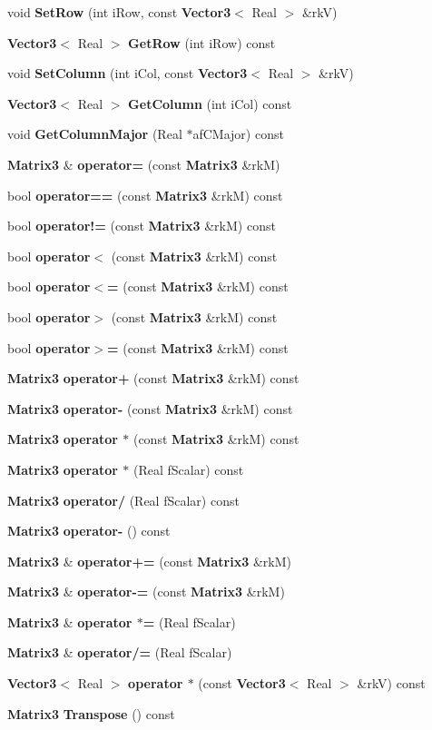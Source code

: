 \begin{CompactItemize}
void {\bf Set\-Row} (int i\-Row, const {\bf Vector3}$<$ Real $>$ \&rk\-V)
\item 
{\bf Vector3}$<$ Real $>$ {\bf Get\-Row} (int i\-Row) const
\item 
void {\bf Set\-Column} (int i\-Col, const {\bf Vector3}$<$ Real $>$ \&rk\-V)
\item 
{\bf Vector3}$<$ Real $>$ {\bf Get\-Column} (int i\-Col) const
\item 
void {\bf Get\-Column\-Major} (Real $\ast$af\-CMajor) const
\item 
{\bf Matrix3} \& {\bf operator=} (const {\bf Matrix3} \&rk\-M)
\item 
bool {\bf operator==} (const {\bf Matrix3} \&rk\-M) const
\item 
bool {\bf operator!=} (const {\bf Matrix3} \&rk\-M) const
\item 
bool {\bf operator$<$} (const {\bf Matrix3} \&rk\-M) const
\item 
bool {\bf operator$<$=} (const {\bf Matrix3} \&rk\-M) const
\item 
bool {\bf operator$>$} (const {\bf Matrix3} \&rk\-M) const
\item 
bool {\bf operator$>$=} (const {\bf Matrix3} \&rk\-M) const
\item 
{\bf Matrix3} {\bf operator+} (const {\bf Matrix3} \&rk\-M) const
\item 
{\bf Matrix3} {\bf operator-} (const {\bf Matrix3} \&rk\-M) const
\item 
{\bf Matrix3} {\bf operator $\ast$} (const {\bf Matrix3} \&rk\-M) const
\item 
{\bf Matrix3} {\bf operator $\ast$} (Real f\-Scalar) const 
\item 
{\bf Matrix3} {\bf operator/} (Real f\-Scalar) const 
\item 
{\bf Matrix3} {\bf operator-} () const
\item 
{\bf Matrix3} \& {\bf operator+=} (const {\bf Matrix3} \&rk\-M)
\item 
{\bf Matrix3} \& {\bf operator-=} (const {\bf Matrix3} \&rk\-M)
\item 
{\bf Matrix3} \& {\bf operator $\ast$=} (Real f\-Scalar)
\item 
{\bf Matrix3} \& {\bf operator/=} (Real f\-Scalar)
\item 
{\bf Vector3}$<$ Real $>$ {\bf operator $\ast$} (const {\bf Vector3}$<$ Real $>$ \&rk\-V) const
\item 
{\bf Matrix3} {\bf Transpose} () const
\item 

\end{CompactItemize}
